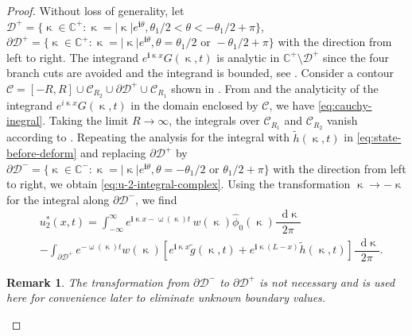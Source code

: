 \documentclass[journal,twoside,web]{ieeecolor}
\newtheorem{remark}{Remark}
\newcommand{\CC}{\mathbb{C}}
\newcommand{\D}{\mathcal{D}}
\newcommand{\C}{\mathcal{C}}
\newcommand{\state}{\phi}
\newcommand{\statehat}{\hat{\state}}
\newcommand{\im}{\mathbf{i}}
\newcommand*\diff{\mathop{}\!\mathrm{d}}
\newcommand{\abs}[1]{\left|#1\right|}
\newcommand{\wcomplex}{\upomega}
\newcommand{\kcomplex}{\upkappa}
\begin{document}
\begin{proof}
Without loss of generality, let $\D^+=\{\kcomplex\in\CC^+:\kcomplex=|\kcomplex|e^{\im\theta}, \theta_1/2<\theta<-\theta_1/2+\pi\}$, $\partial \D^+=\{\kcomplex\in\CC^+:\kcomplex=\abs{\kcomplex}e^{\im \theta}, \theta = \theta_1/2 \text{ or } -\theta_1/2+\pi\}$ with the direction from left to right.
The integrand $e^{\im \kcomplex x}G(\kcomplex,t)$ is analytic in $\CC^+\setminus\D^+$ since the four branch cuts are avoided and the integrand is bounded, see .
Consider a contour $\C = [-R,R]\cup\C_{R_2}\cup\partial\D^+\cup\C_{R_1}$ shown in .
From  and the analyticity of the integrand $e^{i \kcomplex x}G(\kcomplex,t)$ in the domain enclosed by $\C$, we have \eqref{eq:cauchy-inegral}.
Taking the limit $R\to\infty$, the integrals over $\C_{R_1}$ and $\C_{R_2}$ vanish according to . Repeating the analysis for the integral with $\tilde{h}(\kcomplex,t)$ in \eqref{eq:state-before-deform} and replacing $\partial\D^+$ by $\partial \D^-=\{\kcomplex\in\CC^-:\kcomplex=\abs{\kcomplex}e^{\im \theta}, \theta = -\theta_1/2\text{ or } \theta_1/2+\pi\}$ with the direction from left to right, we obtain \eqref{eq:u-2-integral-complex}. Using the transformation $\kcomplex\to-\kcomplex$ for the integral along $\partial\D^-$, we find
\begin{equation}\label{eq:state-after-deform-D+}
	\begin{aligned}
		&u^*_2(x,t)=\int_{-\infty}^{\infty}e^{\im \kcomplex x-\wcomplex(\kcomplex)t}\, w(\kcomplex)\statehat_0(\kcomplex)\dfrac{\diff \kcomplex}{2\pi} \\
		&-\int_{\partial\D^+} e^{-\wcomplex(\kcomplex)t}w(\kcomplex)\left[e^{\im \kcomplex x}\tilde{g}(\kcomplex,t)+e^{\im \kcomplex(L-x) }\tilde{h}(\kcomplex,t) \right]\dfrac{\diff \kcomplex}{2\pi}.
	\end{aligned}
\end{equation}
\begin{remark}
	The transformation from $\partial\D^-$ to $\partial\D^+$ is not necessary and is used here for convenience later to eliminate unknown boundary values.
\end{remark}

\end{proof}
\end{document}
